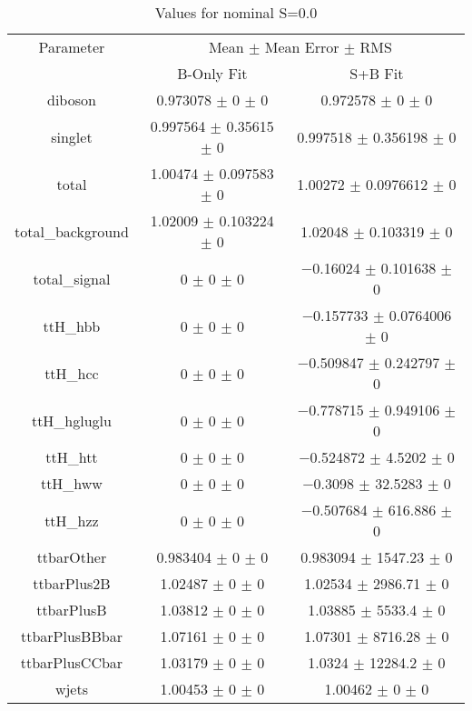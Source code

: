 \begin{table}
\centering
\caption{Values for nominal S=0.0}
\begin{tabular}{ccc}
\toprule
Parameter & \multicolumn{2}{c}{Mean $\pm$ Mean Error $\pm$ RMS}\\
 & B-Only Fit & S+B Fit\\
\midrule
diboson & \num{0.973078} $\pm$ \num{0} $\pm$ \num{0} & \num{0.972578} $\pm$ \num{0} $\pm$ \num{0}\\
singlet & \num{0.997564} $\pm$ \num{0.35615} $\pm$ \num{0} & \num{0.997518} $\pm$ \num{0.356198} $\pm$ \num{0}\\
total & \num{1.00474} $\pm$ \num{0.097583} $\pm$ \num{0} & \num{1.00272} $\pm$ \num{0.0976612} $\pm$ \num{0}\\
total\_background & \num{1.02009} $\pm$ \num{0.103224} $\pm$ \num{0} & \num{1.02048} $\pm$ \num{0.103319} $\pm$ \num{0}\\
total\_signal & \num{0} $\pm$ \num{0} $\pm$ \num{0} & \num{-0.16024} $\pm$ \num{0.101638} $\pm$ \num{0}\\
ttH\_hbb & \num{0} $\pm$ \num{0} $\pm$ \num{0} & \num{-0.157733} $\pm$ \num{0.0764006} $\pm$ \num{0}\\
ttH\_hcc & \num{0} $\pm$ \num{0} $\pm$ \num{0} & \num{-0.509847} $\pm$ \num{0.242797} $\pm$ \num{0}\\
ttH\_hgluglu & \num{0} $\pm$ \num{0} $\pm$ \num{0} & \num{-0.778715} $\pm$ \num{0.949106} $\pm$ \num{0}\\
ttH\_htt & \num{0} $\pm$ \num{0} $\pm$ \num{0} & \num{-0.524872} $\pm$ \num{4.5202} $\pm$ \num{0}\\
ttH\_hww & \num{0} $\pm$ \num{0} $\pm$ \num{0} & \num{-0.3098} $\pm$ \num{32.5283} $\pm$ \num{0}\\
ttH\_hzz & \num{0} $\pm$ \num{0} $\pm$ \num{0} & \num{-0.507684} $\pm$ \num{616.886} $\pm$ \num{0}\\
ttbarOther & \num{0.983404} $\pm$ \num{0} $\pm$ \num{0} & \num{0.983094} $\pm$ \num{1547.23} $\pm$ \num{0}\\
ttbarPlus2B & \num{1.02487} $\pm$ \num{0} $\pm$ \num{0} & \num{1.02534} $\pm$ \num{2986.71} $\pm$ \num{0}\\
ttbarPlusB & \num{1.03812} $\pm$ \num{0} $\pm$ \num{0} & \num{1.03885} $\pm$ \num{5533.4} $\pm$ \num{0}\\
ttbarPlusBBbar & \num{1.07161} $\pm$ \num{0} $\pm$ \num{0} & \num{1.07301} $\pm$ \num{8716.28} $\pm$ \num{0}\\
ttbarPlusCCbar & \num{1.03179} $\pm$ \num{0} $\pm$ \num{0} & \num{1.0324} $\pm$ \num{12284.2} $\pm$ \num{0}\\
wjets & \num{1.00453} $\pm$ \num{0} $\pm$ \num{0} & \num{1.00462} $\pm$ \num{0} $\pm$ \num{0}\\
\bottomrule
\end{tabular}
\end{table}